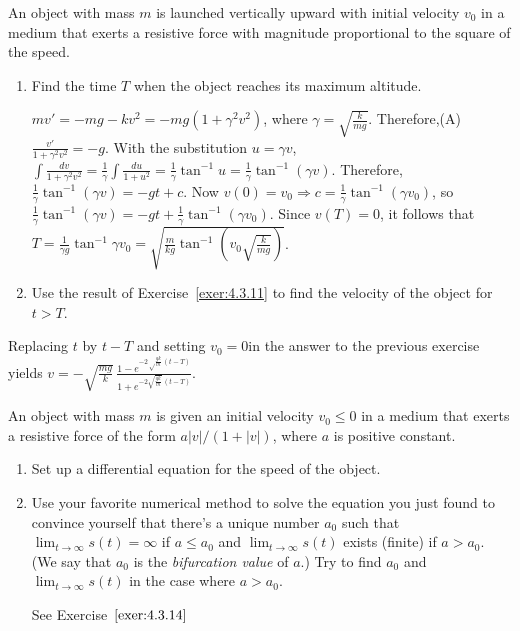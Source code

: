 \documentclass{ximera}
\begin{document}
\begin{problem}\label{exer:4.3.12}
An object with mass $m$ is launched vertically upward with initial
velocity $v_0$ in a medium that exerts a resistive force
with magnitude  proportional to the square of the  speed.


\begin{enumerate}
\item %
Find the time $T$ when the object reaches its maximum
altitude.

\begin{solution}
$mv'=-mg-kv^2=-mg(1+\gamma^2v^2)$, where
$\gamma=\sqrt{\frac{k}{mg}}$. Therefore,(A)  $\frac{v'}{1+\gamma^2v^2}=-g$. With the
substitution $u=\gamma v$,
 $\int{\frac{dv}{1+\gamma^2 v^2}}
=\frac{1}{\gamma}\int{\frac{du}{1+u^2}}=\frac{1}{\gamma}\tan^{-1}u=
\frac{1}{\gamma}\tan^{-1}(\gamma v)$.
Therefore,
$\frac{1}{\gamma}\tan^{-1}(\gamma v)=-gt+c$. Now
$v(0)=v_0\Rightarrow c=\frac{1}{\gamma}\tan^{-1}(\gamma v_0)$, so
$\frac{1}{\gamma}\tan^{-1}(\gamma v)=-gt+
\frac{1}{\gamma}\tan^{-1}(\gamma v_0)$.
Since $v(T)=0$, it follows that $T=\frac{1}{\gamma g}\tan^{-1}\gamma v_0
=\sqrt{\frac{m}{kg}
\tan^{-1}\left(v_0 \sqrt{\frac{k}{mg}}\right)}$.
\end{solution}

\item %
Use the result of Exercise~\ref{exer:4.3.11} to find the velocity of the
object for $t > T$.
\end{enumerate}

\begin{solution}
Replacing $t$ by $t-T$ and setting $v_0=0$in the answer to
the previous exercise yields
$v =-\sqrt{\frac{mg}{k}} \,
\frac{1-e^{-2\sqrt\frac{gk}{m}\, (t-T)}}{{1+e^{-2\sqrt{\frac{gk}{m}}\,
(t-T)}}}$.
\end{solution}
\end{problem}

\begin{problem}\label{exer:4.3.13}  
An object with mass $m$ is given an  initial velocity $v_0\le0$
in a medium that exerts a resistive force of the form
 $a|v|/(1+|v|)$, where  $a$ is positive constant.

\begin{enumerate}
\item %
Set up a differential equation for the speed of the object.
\item %
Use your favorite numerical method to solve the equation you just found to convince yourself that there's a unique number $a_0$ such
that $\lim_{t\to\infty}s(t)=\infty$ if $a\le a_0$ and
$\lim_{t\to\infty}s(t)$ exists (finite) if $a>a_0$. (We say that $a_0$
is the \emph{bifurcation value} of $a$.) Try to find $a_0$ and
$\lim_{t\to\infty}s(t)$ in the case where $a>a_0$.
\begin{hint}
See Exercise~$\ref{exer:4.3.14}$
\end{hint}

\end{enumerate}
\end{problem}
\end{document}
